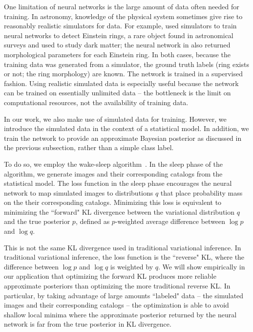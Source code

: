 One limitation of neural networks is the large amount of data often needed for training.
In astronomy, knowledge of the physical system sometimes give rise to reasonably realistic simulators for data. 
For example, \cite{Lanusse_2017_cmudeeplens} used simulators to train neural networks to detect Einstein rings, 
a rare object found in astronomical surveys and used to study dark matter; the neural network in \cite{Hezaveh_2017_nn_lensing_nature} also returned
morphological parameters for each Einstein ring. 
In both cases, because the training data was generated from a simulator, the ground truth labels (ring exists or not; the ring morphology) are known. 
The network is trained in a supervised fashion. 
Using realistic simulated data is especially useful because the network can be trained on essentially unlimited data -- the bottleneck is the limit on computational resources, not the availability of training data. 

In our work, we also make use of simulated data for training. However, we introduce the simulated data in the context of a statistical model.
In addition, we train the network to provide an approximate Bayesian posterior as discussed in the previous subsection, rather than a simple class label. 

To do so, we employ the wake-sleep algorithm~\cite{Hinton1995wake_sleep}. 
In the sleep phase of the algorithm, we generate images and their corresponding catalogs from the statistical model. 
The loss function in the sleep phase encourages the neural network to map simulated images to distributions $q$ that place probability mass on the their corresponding catalogs.
Minimizing this loss is equivalent to minimizing the ``forward" KL divergence between the variational distribution $q$ and the true posterior $p$, defined as $p$-weighted average difference between $\log p$ and $\log q$. 

This is not the same KL divergence used in traditional variational inference.
In traditional variational inference, the loss function is the ``reverse" KL, where the difference between $\log p$ and $\log q$ is weighted by $q$.
We will show empirically in our application that optimizing the forward KL produces more reliable approximate posteriors than optimizing the more traditional reverse KL. 
In particular, by taking advantage of large amounts ``labeled" data -- the simulated images and their corresponding catalogs -- the optimization is able to avoid shallow local minima where the approximate posterior returned by the neural network is far from the true posterior in KL divergence. 

